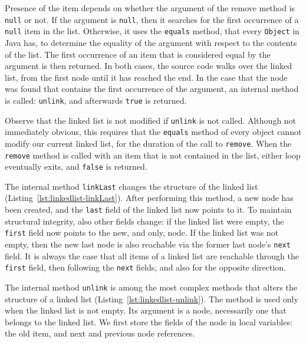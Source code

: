 \documentclass[runningheads]{llncs}
\theoremstyle{remark}
\begin{document}
Presence of the item depends on whether the argument of the remove method is \texttt{null} or not. If the argument is \texttt{null}, then it searches for the first occurrence of a \texttt{null} item in the list. Otherwise, it uses the \texttt{equals} method, that every \texttt{Object} in Java has, to determine the equality of the argument with respect to the contents of the list. The first occurrence of an item that is considered equal by the argument is then returned. In both cases, the source code walks over the linked list, from the first node until it has reached the end. In the case that the node was found that contains the first occurrence of the argument, an internal method is called: \texttt{unlink}, and afterwards \texttt{true} is returned.

Observe that the linked list is not modified if \texttt{unlink} is not called. Although not immediately obvious, this requires that the \texttt{equals} method of every object cannot modify our current linked list, for the duration of the call to \texttt{remove}. When the \texttt{remove} method is called with an item that is not contained in the list, either loop eventually exits, and \texttt{false} is returned.



The internal method \texttt{linkLast} changes the structure of the linked list (Listing~\ref{lst:linkedlist-linkLast}). After performing this method, a new node has been created, and the \texttt{last} field of the linked list now points to it. To maintain structural integrity, also other fields change: if the linked list were empty, the \texttt{first} field now points to the new, and only, node. If the linked list was not empty, then the new last node is also reachable via the former last node's \texttt{next} field. It is always the case that all items of a linked list are reachable through the \texttt{first} field, then following the \texttt{next} fields, and also for the opposite direction.



The internal method \texttt{unlink} is among the most complex methods that alters the structure of a linked list (Listing~\ref{lst:linkedlist-unlink}). The method is used only when the linked list is not empty. Its argument is a node, necessarily one that belongs to the linked list. We first store the fields of the node in local variables: the old item, and next and previous node references.
\end{document}
